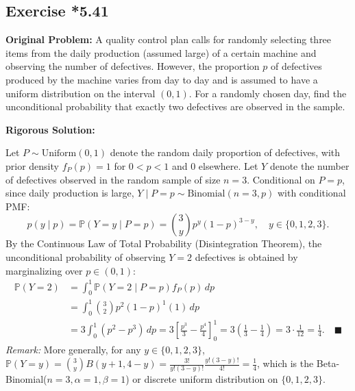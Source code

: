 \documentclass[11pt, letterpaper]{article}
\theoremstyle{definition}
\theoremstyle{remark}
\newcommand{\Prob}{\mathbb{P}}
\begin{document}
\subsection{Exercise *5.41}

\textbf{Original Problem:}
A quality control plan calls for randomly selecting three items from the daily production (assumed large) of a certain machine and observing the number of defectives. However, the proportion $p$ of defectives produced by the machine varies from day to day and is assumed to have a uniform distribution on the interval $(0, 1)$. For a randomly chosen day, find the unconditional probability that exactly two defectives are observed in the sample.

\textbf{Rigorous Solution:}

Let $P \sim \text{Uniform}(0, 1)$ denote the random daily proportion of defectives, with prior density $f_P(p) = 1$ for $0 < p < 1$ and $0$ elsewhere. Let $Y$ denote the number of defectives observed in the random sample of size $n = 3$. Conditional on $P = p$, since daily production is large, $Y \mid P = p \sim \text{Binomial}(n = 3, p)$ with conditional PMF:
\[ p(y \mid p) = \Prob(Y = y \mid P = p) = \binom{3}{y} p^y (1 - p)^{3 - y}, \quad y \in \{0, 1, 2, 3\}. \]
By the Continuous Law of Total Probability (Disintegration Theorem), the unconditional probability of observing $Y = 2$ defectives is obtained by marginalizing over $p \in (0, 1)$:
\begin{align*}
    \Prob(Y = 2) &= \int_0^1 \Prob(Y = 2 \mid P = p) f_P(p) \, dp \\
    &= \int_0^1 \binom{3}{2} p^2 (1 - p)^1 (1) \, dp \\
    &= 3 \int_0^1 (p^2 - p^3) \, dp = 3 \left[ \frac{p^3}{3} - \frac{p^4}{4} \right]_0^1 = 3 \left( \frac{1}{3} - \frac{1}{4} \right) = 3 \cdot \frac{1}{12} = \frac{1}{4}. \quad \blacksquare
\end{align*}
\textit{Remark:} More generally, for any $y \in \{0, 1, 2, 3\}$, $\Prob(Y = y) = \binom{3}{y} B(y + 1, 4 - y) = \frac{3!}{y!(3-y)!} \frac{y!(3-y)!}{4!} = \frac{1}{4}$, which is the Beta-Binomial($n=3, \alpha=1, \beta=1$) or discrete uniform distribution on $\{0, 1, 2, 3\}$.

\end{document}
